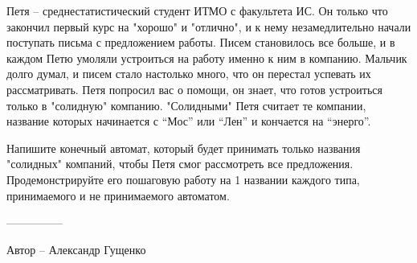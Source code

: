 \question
Петя -- среднестатистический студент ИТМО с факультета ИС. Он только что закончил первый курс на "хорошо" и "отлично", и к нему незамедлительно начали поступать письма с предложением работы. Писем становилось все больше, и в каждом Петю умоляли устроиться на работу именно к ним в компанию. Мальчик долго думал, и писем стало настолько много, что он перестал успевать их рассматривать. Петя попросил вас о помощи, он знает, что готов устроиться только в "солидную" компанию. "Солидными" Петя считает те компании, название которых начинается с “Мос” или “Лен” и кончается на “энерго”. 

Напишите конечный автомат, который будет принимать только названия "солидных" компаний, чтобы Петя смог рассмотреть все предложения. Продемонстрируйте его пошаговую работу на 1 названии каждого типа, принимаемого и не принимаемого автоматом.

---------------

Автор -- Александр Гущенко
